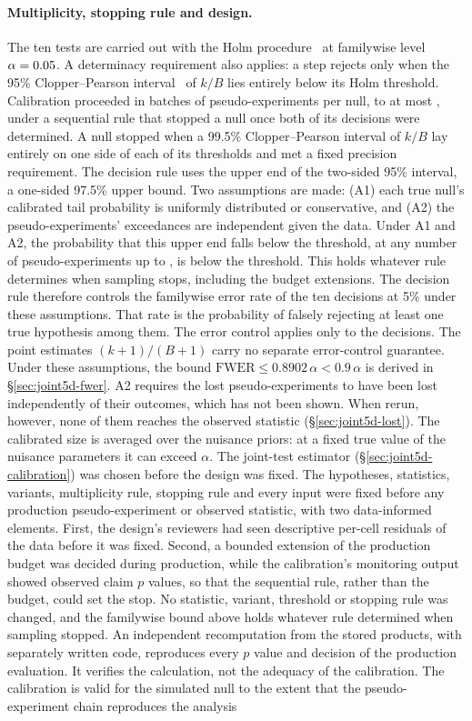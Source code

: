 \paragraph{Multiplicity, stopping rule and design.} The ten tests are carried out with the Holm procedure~\cite{Holm:1979} at familywise level $\alpha=0.05$. A determinacy requirement also applies: a step rejects only when the 95\% Clopper--Pearson interval~\cite{Clopper:1934} of $k/B$ lies entirely below its Holm threshold. Calibration proceeded in batches of \jtBatch{} pseudo-experiments per null, to at most \jtBcap{}, under a sequential rule that stopped a null once both of its decisions were determined. A null stopped when a 99.5\% Clopper--Pearson interval of $k/B$ lay entirely on one side of each of its thresholds and met a fixed precision requirement. The decision rule uses the upper end of the two-sided 95\% interval, a one-sided 97.5\% upper bound. Two assumptions are made: (A1) each true null's calibrated tail probability is uniformly distributed or conservative, and (A2) the pseudo-experiments' exceedances are independent given the data. Under A1 and A2, the probability that this upper end falls below the threshold, at any number of pseudo-experiments up to \jtBcap{}, is below the threshold. This holds whatever rule determines when sampling stops, including the budget extensions. The decision rule therefore controls the familywise error rate of the ten decisions at 5\% under these assumptions. That rate is the probability of falsely rejecting at least one true hypothesis among them. The error control applies only to the decisions. The point estimates $(k+1)/(B+1)$ carry no separate error-control guarantee. Under these assumptions, the bound $\mathrm{FWER}\le0.8902\,\alpha<0.9\,\alpha$ is derived in \S\ref{sec:joint5d-fwer}. A2 requires the lost pseudo-experiments to have been lost independently of their outcomes, which has not been shown. When rerun, however, none of them reaches the observed statistic (\S\ref{sec:joint5d-lost}). The calibrated size is averaged over the nuisance priors: at a fixed true value of the nuisance parameters it can exceed $\alpha$. The joint-test estimator (\S\ref{sec:joint5d-calibration}) was chosen before the design was fixed. The hypotheses, statistics, variants, multiplicity rule, stopping rule and every input were fixed before any production pseudo-experiment or observed statistic, with two data-informed elements. First, the design's reviewers had seen descriptive per-cell residuals of the data before it was fixed. Second, a bounded extension of the production budget was decided during production, while the calibration's monitoring output showed observed claim $p$ values, so that the sequential rule, rather than the budget, could set the stop. No statistic, variant, threshold or stopping rule was changed, and the familywise bound above holds whatever rule determined when sampling stopped. An independent recomputation from the stored products, with separately written code, reproduces every $p$ value and decision of the production evaluation. It verifies the calculation, not the adequacy of the calibration. The calibration is valid for the simulated null to the extent that the pseudo-experiment chain reproduces the analysis 
